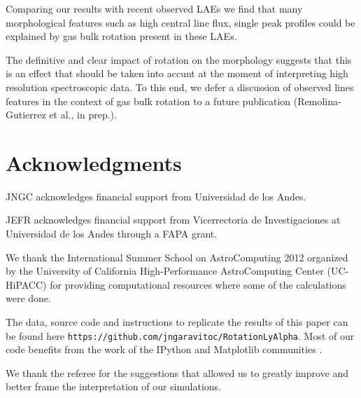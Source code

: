 \documentclass{emulateapj}
\newcommand{\ly}{{\ifmmode{{\rm Ly}\alpha~}\else{Ly$\alpha$~}\fi}}
\begin{document}
Comparing our results with recent observed LAEs we find that many 
morphological features such as high central line flux, single peak
profiles  could be explained by gas bulk  rotation present in these
LAEs. 

The definitive and clear impact of rotation on the \ly morphology
suggests that this is an effect that should be taken into accunt at
the moment of interpreting high resolution spectroscopic data. To this
end, we defer a discussion of observed lines features in the context of gas
bulk rotation to a future publication (Remolina-Gutierrez et al., in
prep.).   

\section*{Acknowledgments}

JNGC acknowledges financial support from Universidad de los
Andes. 

JEFR acknowledges financial support from Vicerrectoria de
Investigaciones at Universidad de los Andes through a FAPA grant.

We thank the International Summer School on AstroComputing
2012 organized by the University of California High-Performance
AstroComputing Center (UC-HiPACC) for providing computational
resources where some of the calculations were done. 

The data, source code and instructions to
replicate the results of this paper can be found
here {\texttt{https://github.com/jngaravitoc/RotationLyAlpha}}.
Most of our code benefits from the work of the IPython and Matplotlib
communities \citep{IPython,matplotlib}.

We thank the referee for the suggestions that allowed us to greatly
improve and better frame the interpretation of our simulations. 



 
\end{document}
